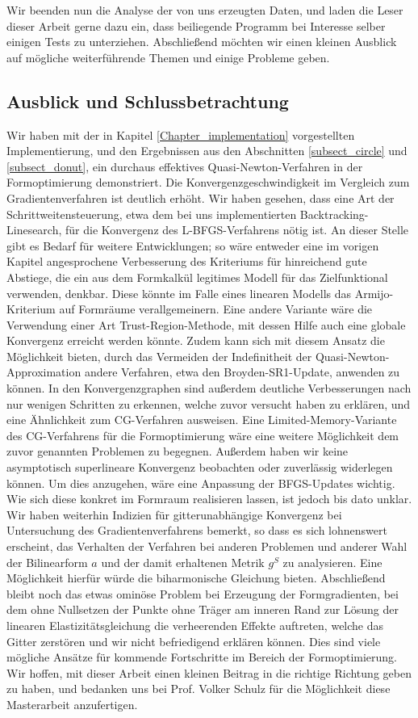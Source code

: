 Wir beenden nun die Analyse der von uns erzeugten Daten, und laden die Leser dieser Arbeit gerne dazu ein, dass beiliegende Programm bei Interesse selber einigen Tests zu unterziehen. Abschließend möchten wir einen kleinen Ausblick auf mögliche weiterführende Themen und einige Probleme geben.

\subsection{Ausblick und Schlussbetrachtung}
Wir haben mit der in Kapitel \ref{Chapter_implementation} vorgestellten Implementierung, und den Ergebnissen aus den Abschnitten \ref{subsect_circle} und \ref{subsect_donut}, ein durchaus effektives Quasi-Newton-Verfahren in der Formoptimierung demonstriert. 
Die Konvergenzgeschwindigkeit im Vergleich zum Gradientenverfahren ist deutlich erhöht. Wir haben gesehen, dass eine Art der Schrittweitensteuerung, etwa dem bei uns implementierten Backtracking-Linesearch, für die Konvergenz des L-BFGS-Verfahrens nötig ist. An dieser Stelle gibt es Bedarf für weitere Entwicklungen; so wäre entweder eine im vorigen Kapitel angesprochene Verbesserung des Kriteriums für hinreichend gute Abstiege, die ein aus dem Formkalkül legitimes Modell für das Zielfunktional verwenden, denkbar. Diese könnte im Falle eines linearen Modells das Armijo-Kriterium auf Formräume verallgemeinern. Eine andere Variante wäre die Verwendung einer Art Trust-Region-Methode, mit dessen Hilfe auch eine globale Konvergenz erreicht werden könnte. Zudem kann sich mit diesem Ansatz die Möglichkeit bieten, durch das Vermeiden der Indefinitheit der Quasi-Newton-Approximation andere Verfahren, etwa den Broyden-SR1-Update, anwenden zu können. In den Konvergenzgraphen sind außerdem deutliche Verbesserungen nach nur wenigen Schritten zu erkennen, welche zuvor versucht haben zu erklären, und eine Ähnlichkeit zum CG-Verfahren ausweisen. Eine Limited-Memory-Variante des CG-Verfahrens für die Formoptimierung wäre eine weitere Möglichkeit dem zuvor genannten Problemen zu begegnen. Außerdem haben wir keine asymptotisch superlineare Konvergenz beobachten oder zuverlässig widerlegen können. Um dies anzugehen, wäre eine Anpassung der BFGS-Updates wichtig. Wie sich diese konkret im Formraum realisieren lassen, ist jedoch bis dato unklar. Wir haben weiterhin Indizien für gitterunabhängige Konvergenz bei Untersuchung des Gradientenverfahrens bemerkt, so dass es sich lohnenswert erscheint, das Verhalten der Verfahren bei anderen Problemen und anderer Wahl der Bilinearform $a$ und der damit erhaltenen Metrik $g^S$ zu analysieren. Eine Möglichkeit hierfür würde die biharmonische Gleichung bieten. Abschließend bleibt noch das etwas ominöse Problem bei Erzeugung der Formgradienten, bei dem ohne Nullsetzen der Punkte ohne Träger am inneren Rand zur Lösung der linearen Elastizitätsgleichung die verheerenden Effekte auftreten, welche das Gitter zerstören und wir nicht befriedigend erklären können. Dies sind viele mögliche Ansätze für kommende  Fortschritte im Bereich der Formoptimierung. Wir hoffen, mit dieser Arbeit einen kleinen Beitrag in die richtige Richtung geben zu haben, und bedanken uns bei Prof. Volker Schulz für die Möglichkeit diese Masterarbeit anzufertigen.
\newpage
\nocite{*}




